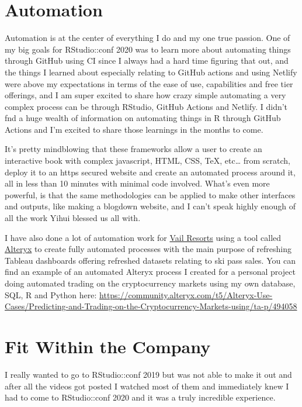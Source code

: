 \documentclass[
]{book}
\begin{document}
\hypertarget{automation}{%
\section{Automation}\label{automation}}

Automation is at the center of everything I do and my one true passion. One of my big goals for RStudio::conf 2020 was to learn more about automating things through GitHub using CI since I always had a hard time figuring that out, and the things I learned about especially relating to GitHub actions and using Netlify were above my expectations in terms of the ease of use, capabilities and free tier offerings, and I am super excited to share how crazy simple automating a very complex process can be through RStudio, GitHub Actions and Netlify. I didn't fnd a huge wealth of information on automating things in R through GitHub Actions and I'm excited to share those learnings in the months to come.

It's pretty mindblowing that these frameworks allow a user to create an interactive book with complex javascript, HTML, CSS, TeX, etc\ldots{} from scratch, deploy it to an https secured website and create an automated process around it, all in less than 10 minutes with minimal code involved. What's even more powerful, is that the same methodologies can be applied to make other interfaces and outputs, like making a blogdown website, and I can't speak highly enough of all the work Yihui blessed us all with.

I have also done a lot of automation work for \href{https://www.google.com/search?q=vail+resorts+stock}{Vail Resorts} using a tool called \href{https://www.alteryx.com/}{Alteryx} to create fully automated processes with the main purpose of refreshing Tableau dashboards offering refreshed datasets relating to ski pass sales. You can find an example of an automated Alteryx process I created for a personal project doing automated trading on the cryptocurrency markets using my own database, SQL, R and Python here: \url{https://community.alteryx.com/t5/Alteryx-Use-Cases/Predicting-and-Trading-on-the-Cryptocurrency-Markets-using/ta-p/494058}

\hypertarget{rstudio}{%
\section{Fit Within the Company}\label{rstudio}}

I really wanted to go to RStudio::conf 2019 but was not able to make it out and after all the videos got posted I watched most of them and immediately knew I had to come to RStudio::conf 2020 and it was a truly incredible experience.
\end{document}
